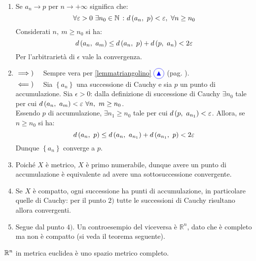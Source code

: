 \begin{demonstration}~{}
	\begin{enumerate}[label=\Roman*]
		\item Se $a_n\to p$ per $n\to +\infty$ significa che:
		\begin{equation*}
			\forall \epsilon>0\ \exists n_0\in\naturalset\ \colon \mvf{d}{a_n}{p}<\epsilon,\ \forall n\geq n_0
		\end{equation*}
	Considerati $n,\ m\geq n_0$ si ha:
	\begin{equation}
		d\left(a_n,\ a_m\right)\leq d\left(a_n,\ p\right)+d\left(p,\ a_n\right)< 2\varepsilon
	\end{equation}
Per l'arbitrarietà di $\epsilon$ vale la convergenza.
\item $\implies)\quad$ Sempre vera per  \ref{lemmatriangolino} $\textcolor{blue}{\circled{{\large \blacktriangle}}}$ (pag. \pageref{lemmatriangolino}).\\
$\impliedby)\quad$ Sia $\left\{a_n\right\}$ una successione di Cauchy e sia $p$ un punto di accumulazione. Sia $\epsilon>0$: dalla definizione di successione di Cauchy $\exists n_0$ tale per cui $\mvf{d}{a_n}{a_m}<\epsilon\ \forall n,\ m\geq n_0$.\\
Essendo $p$ di accumulazione, $\exists n_1\geq n_0$ tale per cui $d\left(p,\ a_{n_1}\right)<\varepsilon$. Allora, se $n\geq n_0$ si ha:
	\begin{equation*}
	d\left(a_n,\ p\right)\leq d\left(a_n,\ a_{n_1}\right)+d\left(a_{n_1},\ p\right)< 2\varepsilon
\end{equation*}
Dunque $\left\{a_n\right\}$ converge a $p$.
\item Poiché $X$ è metrico, $X$ è primo numerabile, dunque avere un punto di accumulazione è equivalente ad avere una sottosuccessione convergente.
\item Se $X$ è compatto, ogni successione ha punti di accumulazione, in particolare quelle di Cauchy: per il punto $2)$ tutte le successioni di Cauchy risultano allora convergenti.
\item Segue dal punto $4)$. Un controesempio del viceversa è $\mathbb{R}^n$, dato che è completo ma non è compatto (si veda il teorema seguente). 
\end{enumerate}
\vspace{-3mm}
\end{demonstration}
\begin{theorema}
	$\mathbb{R}^n$ in metrica euclidea è uno spazio metrico completo.
\end{theorema}

